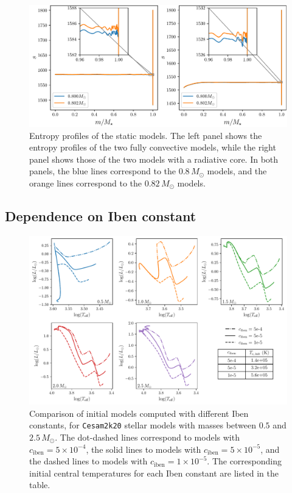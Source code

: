 \documentclass[12pt,a4paper]{article}
\newcommand{\mr}{\mathrm}
\begin{document}
\begin{figure}
  \centering  
  \includegraphics[width=\textwidth,keepaspectratio]{toy_problem_entropy.pdf}
  \caption{Entropy profiles of the static models. The left panel shows the entropy profiles of the two fully convective models, while the right panel shows those of the two models with a radiative core. In both panels, the blue lines correspond to the $0.8\,M_\odot$ models, and the orange lines correspond to the $0.82\,M_\odot$ models.} \label{fig:toy_problem_entropy}
\end{figure}

\subsection{Dependence on Iben constant}
\label{sec:initial_models}

\begin{figure}[htbp]
  \centering
  \includegraphics[width=\textwidth,keepaspectratio]{ciben_mass_init.pdf}
  \caption{Comparison of initial models computed with different Iben constants, for \texttt{Cesam2k20} stellar models with masses between $0.5$ and $2.5\,M_\odot$. The dot-dashed lines correspond to models with $c_\mr{iben} = 5\times10^{-4}$, the solid lines to models with $c_\mr{iben} = 5\times10^{-5}$, and the dashed lines to models with $c_\mr{iben} = 1\times10^{-5}$. The corresponding initial central temperatures for each Iben constant are listed in the table.} \label{fig:comp_iben}
\end{figure}
\end{document}
